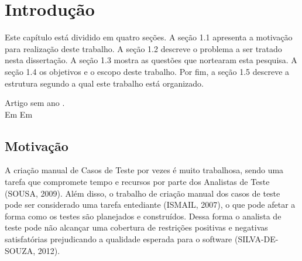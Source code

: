 \chapter{Introdução}

Este capítulo está dividido em quatro seções. A seção 1.1 apresenta a motivação para realização deste trabalho. A seção 1.2 descreve o problema a ser tratado nesta dissertação. A seção 1.3 mostra as questões que nortearam esta pesquisa. A seção 1.4 os objetivos e o escopo deste trabalho. Por fim, a seção 1.5 descreve a estrutura segundo a qual este trabalho está organizado.


Artigo sem ano \citet{Longuet-1950}.   \\
Em \citep{SPH_LIU_2003}
Em \cite{Scan-1990-Blelloch}

\section{Motivação}



A criação manual de Casos de Teste por vezes é muito trabalhosa, sendo uma tarefa que compromete tempo e recursos por parte dos Analistas de Teste (SOUSA, 2009). Além disso, o trabalho de criação manual dos casos de teste pode ser considerado uma tarefa entediante (ISMAIL, 2007), o que pode afetar a forma como os testes são planejados e construídos. Dessa forma o analista de teste pode não alcançar uma cobertura de restrições positivas e negativas satisfatórias prejudicando a qualidade esperada para o software (SILVA-DE-SOUZA, 2012).

